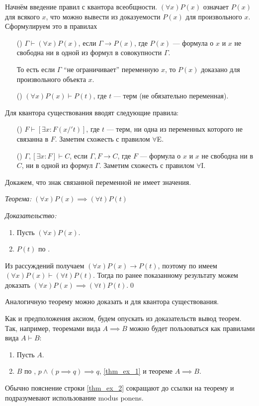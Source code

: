 Начнём введение правил с квантора всеобщности. $(\forall x)P(x)$ означает
$P(x)$ для всякого $x$, что можно вывести из
доказуемости $P(x)$ для произвольного $x$.
Сформулируем это в правилах
\begin{enumerate}
  \item[(\Aii{})]{}$\Gamma\vdash(\forall x)P(x)$, если ${\Gamma\to P(x)}$, где
  $P(x)$ --- формула о $x$ и $x$ не свободна ни в одной из формул
  в совокупности $\Gamma$.

  То есть если $\Gamma$ ``не ограничивает'' переменную $x$,
  то $P(x)$ доказано для произвольного объекта $x$.

  \item[(\Aee{})]{}$(\forall x)P(x)\vdash P(t)$, где $t$ --- терм
  (не обязательно переменная).
\end{enumerate}

Для квантора существования вводят следующие правила:
\begin{enumerate}
  \item[(\Eii{})]${F\vdash [\exists x:F(x/'t)]}$, где $t$ --- терм,
  ни одна из переменных которого не связанна в $F$.
  Заметим схожесть с правилом $\forall$E.

  \item[(\Eee{})]${\Gamma, [\exists x:F]\vdash C}$, если $\Gamma, F\to C$,
  где $F$ --- формула о $x$ и $x$ не свободна ни в $C$, ни в одной из формул $\Gamma$.
  Заметим схожесть с правилом $\forall$I.
\end{enumerate}

Докажем, что знак связанной переменной не имеет значения.

{\it Теорема:}
$(\forall x)P(x)\implies (\forall t)P(t)$

{\it Доказательство:}
\begin{enumerate}[label=(\arabic*)]
  \item{}Пусть $(\forall x)P(x)$.
  \item{}$P(t)$ по \Aee{}.
\end{enumerate}
Из рассуждений получаем $(\forall x)P(x)\to P(t)$,
поэтому по \Aii{} имеем $(\forall x)P(x)\vdash (\forall t)P(t)$.
Тогда по ранее показанному результату
можем доказать $(\forall x)P(x)\implies (\forall t)P(t)$.\qed

Аналогичную теорему можно доказать и для квантора существования.

Как и предположения аксиом, будем опускать из доказательств вывод
теорем. Так, например, теоремами вида $A\implies B$
можно будет пользоваться как правилами вида $A\vdash B$:
\begin{enumerate}[label=(\arabic*)]
  \item{}\label{thm_ex_1}Пусть $A$.
  \item{}\label{thm_ex_2}$B$ по \taut{}, $p\land (p\implies q)\implies q$,
  \ref{thm_ex_1} и теореме $A\implies B$.
\end{enumerate}
Обычно пояснение строки \ref{thm_ex_2} сокращают до ссылки на теорему
и подразумевают использование modus ponens.


